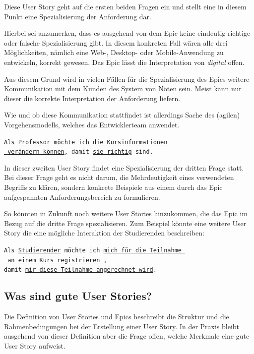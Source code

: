 \documentclass[acmtog]{acmart}
\begin{document}
Diese User Story geht auf die ersten beiden Fragen ein und stellt eine in diesem Punkt
eine Spezialisierung der Anforderung dar.

Hierbei sei anzumerken, dass es ausgehend von dem Epic keine eindeutig richtige oder
falsche Spezialisierung gibt.
In diesem konkreten Fall wären alle drei Möglichkeiten,
nämlich eine Web-, Desktop- oder Mobile-Anwendung zu entwickeln, korrekt gewesen.
Das Epic lässt die Interpretation von \emph{digital} offen.

Aus diesem Grund wird in vielen Fällen für die Spezialisierung des Epics weitere Kommunikation
mit dem Kunden des System von Nöten sein.
Meist kann nur dieser die korrekte Interpretation der Anforderung liefern.

Wie und ob diese Kommunikation stattfindet ist allerdings Sache des (agilen) Vorgehensmodells, welches
das Entwicklerteam anwendet.

\vspace{1em}
\texttt{Als \underline{Professor} möchte ich \underline{die Kursinformationen }\\
	\hspace*{4.5em} \underline{ verändern können}, damit \underline{sie richtig} sind.}
\vspace{1em}

In dieser zweiten User Story findet eine Spezialisierung der dritten Frage statt.
Bei dieser Frage geht es nicht darum, die Mehrdeutigkeit eines verwendeten Begriffs zu klären,
sondern konkrete Beispiele aus einem durch das Epic aufgespannten Anforderungsbereich
zu formulieren.

So könnten in Zukunft noch weitere User Stories hinzukommen, die das Epic im Bezug auf die dritte
Frage spezialisieren.
Zum Beispiel könnte eine weitere User Story die eine mögliche Interaktion der Studierenden beschreiben:

\vspace{1em}
\texttt{Als \underline{Studierender} möchte ich \underline{mich für die Teilnahme }\\
	\hspace*{2em}\underline{ an einem Kurs registrieren },\\
	\hspace*{4em}damit \underline{mir diese Teilnahme angerechnet wird}.}
\vspace{1em}

\subsection{Was sind gute User Stories?}
Die Definition von User Stories und Epics beschreibt die Struktur und die Rahmenbedingungen bei der Erstellung einer User Story.
In der Praxis bleibt ausgehend von dieser Definition aber die Frage offen, welche Merkmale eine gute User Story aufweist.
\end{document}
